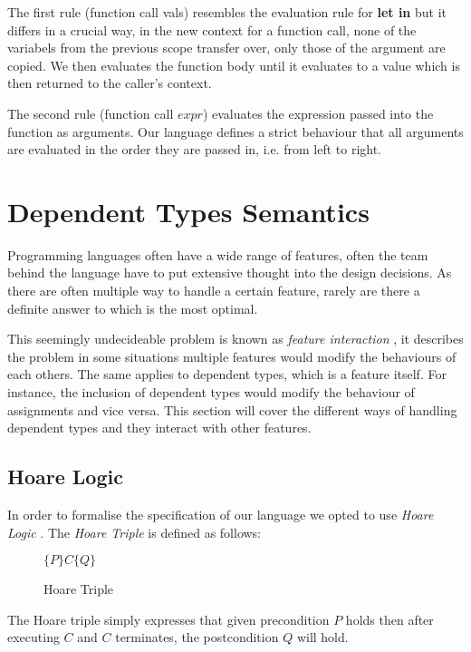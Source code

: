 \documentclass[a4paper,12pt]{report}
\begin{document}
\par
The first rule (function call vals) resembles the evaluation rule for 
\textbf{let in} but it differs in a crucial way, in the new context for a 
function call, none of the variabels from the previous scope transfer over, only 
those of the argument are copied. We then evaluates the function body until it 
evaluates to a value which is then returned to the caller's context. 

\par
The second rule (function call $expr$) evaluates the expression passed into the 
function as arguments. Our language defines a strict behaviour that all 
arguments are evaluated in the order they are passed in, i.e. from left to right. 

\section{Dependent Types Semantics}
Programming languages often have a wide range of features, often the team behind 
the language have to put extensive thought into the design decisions. As there 
are often multiple way to handle a certain feature, rarely are there a definite 
answer to which is the most optimal.

\par
This seemingly undecideable problem is known as \textit{feature interaction} 
\cite{featInteract}, it describes the problem in some situations multiple 
features would modify the behaviours of each others. The same applies to 
dependent types, which is a feature itself. For instance, the inclusion of dependent types 
would modify the behaviour of assignments and vice versa. This section 
will cover the different ways of handling dependent types and they interact with 
other features.

\subsection{Hoare Logic}
In order to formalise the specification of our language we opted to use 
\textit{Hoare Logic} \cite{hoare}. The \textit{Hoare Triple} is defined as follows: 

\begin{figure}[H]
  \begin{center}
    $\{P\}C\{Q\}$
  \end{center}
  \caption{Hoare Triple}
\end{figure}
The Hoare triple simply expresses that given precondition $P$ holds then after executing $C$ 
and $C$ terminates, the postcondition $Q$ will hold.
\end{document}
